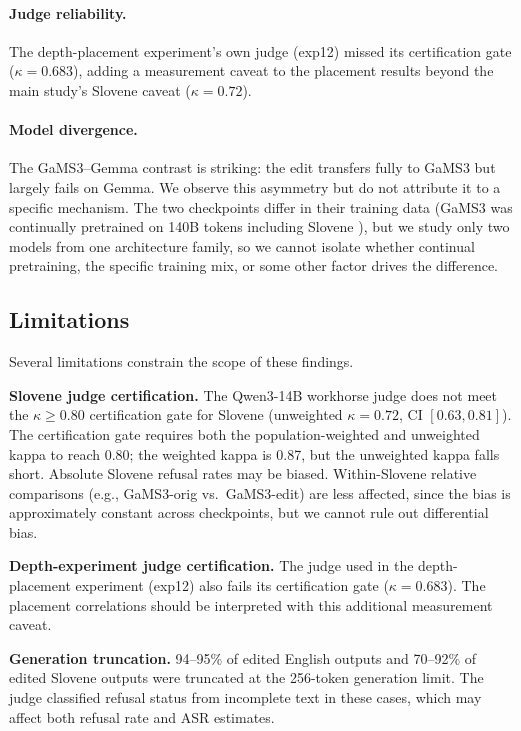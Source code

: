 \documentclass[11pt,letterpaper]{article}
\begin{document}
\paragraph{Judge reliability.} The depth-placement experiment's own judge (exp12) missed its certification gate ($\kappa = 0.683$), adding a measurement caveat to the placement results beyond the main study's Slovene caveat ($\kappa = 0.72$).

\paragraph{Model divergence.} The GaMS3--Gemma contrast is striking: the edit transfers fully to GaMS3 but largely fails on Gemma. We observe this asymmetry but do not attribute it to a specific mechanism. The two checkpoints differ in their training data (GaMS3 was continually pretrained on 140B tokens including Slovene \citep{Vres2026}), but we study only two models from one architecture family, so we cannot isolate whether continual pretraining, the specific training mix, or some other factor drives the difference.

\subsection{Limitations}
\label{sec:limitations}

Several limitations constrain the scope of these findings.

\textbf{Slovene judge certification.} The Qwen3-14B workhorse judge does not meet the $\kappa \geq 0.80$ certification gate for Slovene (unweighted $\kappa = 0.72$, CI $[0.63, 0.81]$). The certification gate requires both the population-weighted and unweighted kappa to reach 0.80; the weighted kappa is 0.87, but the unweighted kappa falls short. Absolute Slovene refusal rates may be biased. Within-Slovene relative comparisons (e.g., GaMS3-orig vs.\ GaMS3-edit) are less affected, since the bias is approximately constant across checkpoints, but we cannot rule out differential bias.

\textbf{Depth-experiment judge certification.} The judge used in the depth-placement experiment (exp12) also fails its certification gate ($\kappa = 0.683$). The placement correlations should be interpreted with this additional measurement caveat.

\textbf{Generation truncation.} 94--95\% of edited English outputs and 70--92\% of edited Slovene outputs were truncated at the 256-token generation limit. The judge classified refusal status from incomplete text in these cases, which may affect both refusal rate and ASR estimates.
\end{document}
